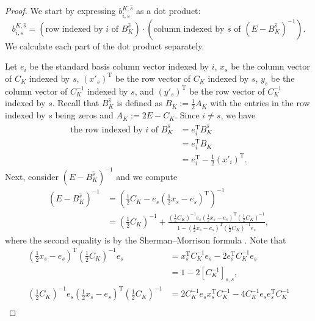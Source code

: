 \documentclass[11pt, letterpaper]{amsart}
\numberwithin{equation}{section}
\begin{document}
\begin{proof}
    We start by expressing $b^{K, \widehat{s}}_{i, s}$ as a dot product:
    \[
    b^{K, \widehat{s}}_{i, s} = \left(\text{row indexed by $i$ of } B_K^{\widehat{s}}\right) \cdot \left(\text{column indexed by $s$ of } (E - B_K^{\widehat{s}})^{-1}\right).
    \]
    We calculate each part of the dot product separately.

    Let \(e_i\) be the standard basis column vector indexed by $i$, \(x_s\) be the column vector  of \(C_K\) indexed by $s$, \((x'_s)^{\text{T}}\) be the row vector  of \(C_K\) indexed by $s$, \(y_s\) be the column vector  of \(C_K^{-1}\) indexed by $s$, and \((y'_s)^{\text{T}}\) be the row vector  of \(C_K^{-1}\) indexed by $s$.  Recall that $B_K^{\widehat{s}}$ is defined as $B_K:=\frac{1}{2}A_K$ with the entries in the row indexed by $s$ being zeros and $A_K:=2E-C_K$. Since \(i \neq s\), we have
    \begin{align*}
        \text{the row indexed by $i$ of } B_K^{\widehat{s}} 
        &= e_i^{\text{T}} B_K^{\widehat{s}} \\
        &= e_i^{\text{T}} B_K \\
        &= e_i^{\text{T}} - \frac{1}{2} (x'_i)^{\text{T}}.
    \end{align*}
    Next, consider \((E - B_K^{\widehat{s}})^{-1}\) and we compute
    \begin{align*}
        (E - B_K^{\widehat{s}})^{-1} 
        &= \left(\frac{1}{2}C_K - e_s \left(\frac{1}{2}x_s - e_s\right)^{\text{T}}\right)^{-1} \\
        &= \left(\frac{1}{2}C_K\right)^{-1} + \frac{\left(\frac{1}{2}C_K\right)^{-1} e_s \left(\frac{1}{2}x_s - e_s\right)^{\text{T}} \left(\frac{1}{2}C_K\right)^{-1}}{1 - \left(\frac{1}{2}x_s - e_s\right)^{\text{T}} \left(\frac{1}{2}C_K\right)^{-1} e_s},
    \end{align*}
    where the second equality is by the Sherman--Morrison formula \cite{sherman1950adjustment}. 
    Note that
    \begin{align*}
        \left(\frac{1}{2}x_s - e_s\right)^{\text{T}}\left(\frac{1}{2}C_K\right)^{-1}e_s &= x_s^{\text{T}}C_K^{-1}e_s - 2e_s^{\text{T}}C_K^{-1}e_s \\
        &= 1 - 2[C_K^{-1}]_{s,s}, \\
        \left(\frac{1}{2}C_K\right)^{-1} e_s \left(\frac{1}{2}x_s - e_s\right)^{\text{T}} \left(\frac{1}{2}C_K\right)^{-1} &= 2C_K^{-1}e_sx_s^{\text{T}}C_K^{-1} - 4C_K^{-1}e_se_s^{\text{T}}C_K^{-1} \\

\end{align*}
\end{proof}
\end{document}
